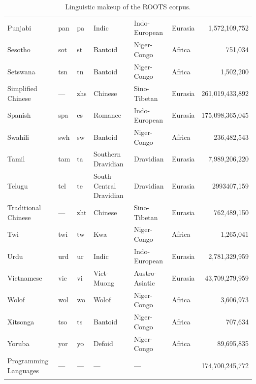 \documentclass[twoside,11pt]{article}
\begin{document}
\begin{table}[]
{\begin{tabular}{lTTlllr}
Punjabi             & pan       & pa          & Indic                   & Indo-European  & Eurasia   & 1,572,109,752    \\
Sesotho             & sot       & st          & Bantoid                 & Niger-Congo    & Africa    & 751,034        \\
Setswana            & tsn       & tn          & Bantoid                 & Niger-Congo    & Africa    & 1,502,200       \\
Simplified Chinese  &     ---      & zhs         & Chinese                 & Sino-Tibetan   & Eurasia   & 261,019,433,892  \\
Spanish             & spa       & es          & Romance                 & Indo-European  & Eurasia   & 175,098,365,045  \\
Swahili             & swh       & sw          & Bantoid                 & Niger-Congo    & Africa    & 236,482,543     \\
Tamil               & tam       & ta          & Southern Dravidian      & Dravidian      & Eurasia   & 7,989,206,220    \\
Telugu              & tel       & te          & South-Central Dravidian & Dravidian      & Eurasia   & 2993407,159    \\
Traditional Chinese &      ---     & zht         & Chinese                 & Sino-Tibetan   & Eurasia   & 762,489,150     \\
Twi                 & twi       & tw          & Kwa                     & Niger-Congo    & Africa    & 1,265,041       \\
Urdu                & urd       & ur          & Indic                   & Indo-European  & Eurasia   & 2,781,329,959    \\
Vietnamese          & vie       & vi          & Viet-Muong              & Austro-Asiatic & Eurasia   & 43,709,279,959   \\
Wolof               & wol       & wo          & Wolof                   & Niger-Congo    & Africa    & 3,606,973       \\

Xitsonga            & tso       & ts          & Bantoid                 & Niger-Congo    & Africa    & 707,634        \\
Yoruba              & yor       & yo          & Defoid                  & Niger-Congo    & Africa    & 89,695,835      \\
Programming Languages                & ---      & ---        & ---                    & ---           &       & 174,700,245,772 \\
\bottomrule \\
\end{tabular}%
}
\caption{Linguistic makeup of the ROOTS corpus.}
\label{tab:language_families}
\end{table}
\end{document}
